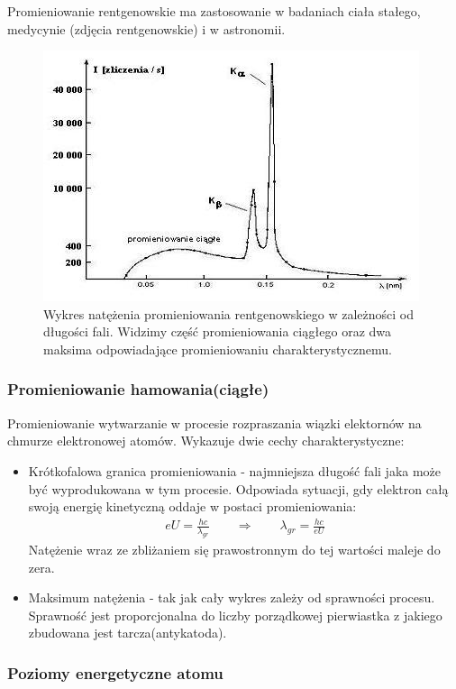 \documentclass[paper=a4, fontsize=12pt]{scrartcl}
\begin{document}
Promieniowanie rentgenowskie ma zastosowanie w badaniach ciała stałego, medycynie (zdjęcia rentgenowskie) i w astronomii.
\begin{figure}
\centering
\includegraphics[width=0.7\linewidth]{promren}
\caption{Wykres natężenia promieniowania rentgenowskiego w zależności od długości fali. Widzimy część promieniowania ciągłego oraz dwa maksima odpowiadające promieniowaniu charakterystycznemu.}
\label{fig:promren}
\end{figure}

\subsubsection{Promieniowanie hamowania(ciągłe)}
Promieniowanie wytwarzanie w procesie rozpraszania wiązki elektornów na chmurze elektronowej atomów. Wykazuje dwie cechy charakterystyczne:
\begin{itemize}
	\item Krótkofalowa granica promieniowania - najmniejsza długość fali jaka może być wyprodukowana w tym procesie. Odpowiada sytuacji, gdy elektron całą swoją energię kinetyczną oddaje w postaci promieniowania:
	\begin{align*}
	eU=\frac{hc}{\lambda_{gr}} \qquad\Rightarrow\qquad \lambda_{gr}=\frac{hc}{eU}
	\end{align*}
	Natężenie wraz ze zbliżaniem się prawostronnym do tej wartości maleje do zera.
	\item Maksimum natężenia - tak jak cały wykres zależy od sprawności procesu. Sprawność jest proporcjonalna do liczby porządkowej pierwiastka z jakiego zbudowana jest tarcza(antykatoda).
\end{itemize}

\subsubsection{Poziomy energetyczne atomu}
\end{document}
